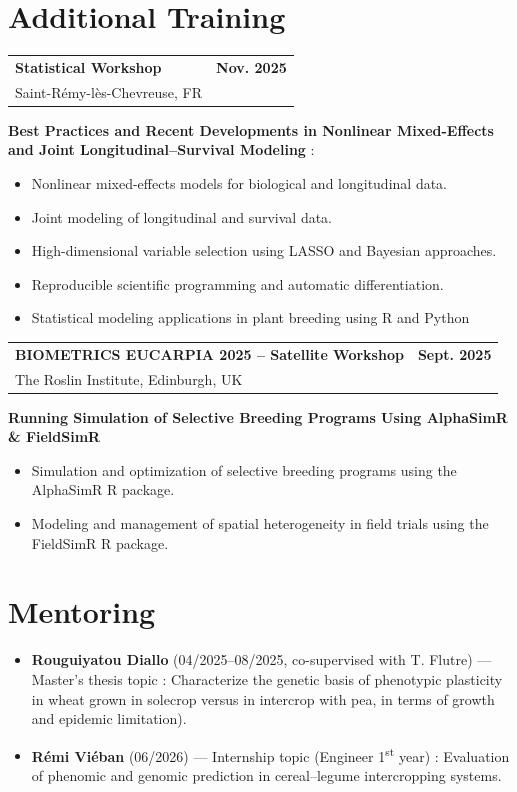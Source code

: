 \documentclass[10pt,a4paper]{article}
\makeatletter
\newcommand{\sizeTitre}{\fontsize{11}{13.2}\selectfont}  %
\newcommand{\sizeDate} {\fontsize{10}{13.2}\selectfont}  %
\newcommand{\sizeOrg}  {\fontsize{10}{12}\selectfont}    %
\newcommand{\sizeLieu} {\fontsize{10}{12}\selectfont}    %
\newcommand{\cventry}[5][2pt]{%
  \par\noindent\begin{tabularx}{\textwidth}{@{}Xr@{}}
    {\sizeTitre\textbf{#2}} & {\sizeDate\textbf{#5}}\\
    {\sizeOrg #3}   & {\sizeLieu #4}\\
  \end{tabularx}\par\vspace{#1}}
\makeatother
\begin{document}
\section{Additional Training}
\cventry{Statistical Workshop}{Saint-Rémy-lès-Chevreuse, FR}{}{Nov. 2025}
\noindent
\textbf{Best Practices and Recent Developments in Nonlinear Mixed-Effects and Joint Longitudinal–Survival Modeling} : 
  \begin{itemize}[label=\textbullet, itemsep=1pt]
	 \item Nonlinear mixed-effects models for biological and longitudinal data.
	\item Joint modeling of longitudinal and survival data.
	\item High-dimensional variable selection using LASSO and Bayesian approaches.
	\item Reproducible scientific programming and automatic differentiation.
	\item Statistical modeling applications in plant breeding using R and Python
\end{itemize}
\bigskip
\cventry{BIOMETRICS EUCARPIA 2025 -- Satellite Workshop}{The Roslin Institute, Edinburgh, UK}{}{Sept. 2025}
\noindent
\textbf{Running Simulation of Selective Breeding Programs Using AlphaSimR \& FieldSimR}
  \begin{itemize}[label=\textbullet, itemsep=1pt]
  \item Simulation and optimization of selective breeding programs using the AlphaSimR R package.
  \item Modeling and management of spatial heterogeneity in field trials using the FieldSimR R package.
\end{itemize}

\section{Mentoring}
\begin{itemize}[label=\textbullet, itemsep=6pt]
  \item \textbf{Rouguiyatou Diallo} (04/2025--08/2025, co-supervised with T. Flutre) --- Master’s thesis topic : Characterize the genetic basis of phenotypic plasticity in wheat grown in solecrop versus in intercrop with pea, in terms of growth and epidemic limitation).
  \item \textbf{Rémi Viéban} (06/2026) --- Internship topic (Engineer 1\textsuperscript{st} year) : Evaluation of phenomic and genomic prediction in cereal--legume intercropping systems.
\end{itemize}
\end{document}
